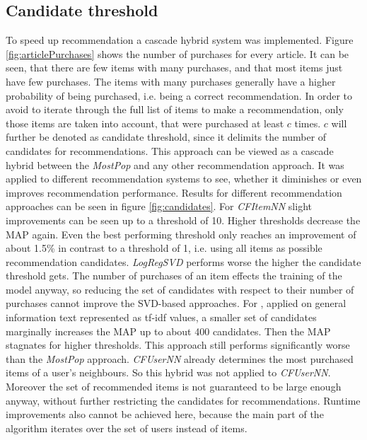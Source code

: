 \documentclass[10pt]{reportMaster}
\begin{document}
\subsection*{Candidate threshold}
To speed up recommendation a cascade hybrid system was implemented.
Figure \ref{fig:articlePurchases} shows the number of purchases for every article.
It can be seen, that there are few items with many purchases, and that most items just have few purchases.
The items with many purchases generally have a higher probability of being purchased, i.e. being a correct recommendation.
In order to avoid to iterate through the full list of items to make a recommendation, only those items are taken into account, that were purchased at least $c$ times.
$c$ will further be denoted as candidate threshold, since it delimits the number of candidates for recommendations.
This approach can be viewed as a cascade hybrid between the \textit{MostPop} and any other recommendation approach.
It was applied to different recommendation systems to see, whether it diminishes or even improves recommendation performance.
Results for different recommendation approaches can be seen in figure \ref{fig:candidates}.
For \textit{CFItemNN} slight improvements can be seen up to a threshold of 10.
Higher thresholds decrease the MAP again.
Even the best performing threshold only reaches an improvement of about 1.5\% in contrast to a threshold of 1, i.e. using all items as possible recommendation candidates.
\textit{LogRegSVD} performs worse the higher the candidate threshold gets.
The number of purchases of an item effects the training of the model anyway, so reducing the set of candidates with respect to their number of purchases cannot improve the SVD-based approaches.
For , applied on general information text represented as tf-idf values, a smaller set of candidates marginally increases the MAP up to about 400 candidates.
Then the MAP stagnates for higher thresholds.
This approach still performs significantly worse than the \textit{MostPop} approach.
\textit{CFUserNN} already determines the most purchased items of a user's neighbours.
So this hybrid was not applied to \textit{CFUserNN}.
Moreover the set of recommended items is not guaranteed to be large enough anyway, without further restricting the candidates for recommendations.
Runtime improvements also cannot be achieved here, because the main part of the algorithm iterates over the set of users instead of items.
\end{document}
